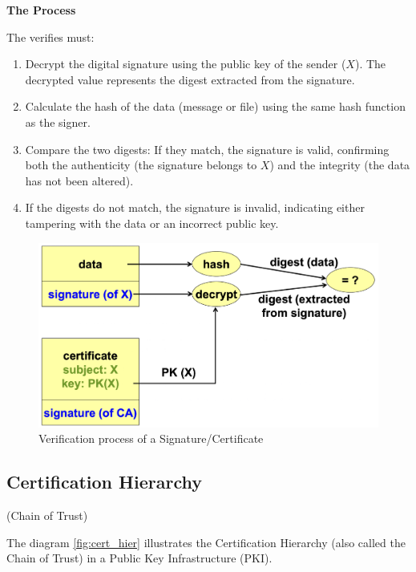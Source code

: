\begin{center}
    \textbf{The Process}
\end{center}
The verifies must:
\begin{enumerate}
    \item Decrypt the digital signature using the public key of the sender ($X$). The decrypted value represents the digest extracted from the signature.
    \item Calculate the hash of the data (message or file) using the same hash function as the signer.
    \item Compare the two digests: If they match, the signature is valid, confirming both the authenticity (the signature belongs to $X$) and the integrity (the data has not been altered).
    \item If the digests do not match, the signature is invalid, indicating either tampering with the data or an incorrect public key.
    \end{enumerate}
\begin{figure}[H]
    \centering
    \includegraphics[width=0.5\linewidth]{Images/Cryptography/cert_verif.png}
    \caption{Verification process of a Signature/Certificate}
\end{figure}

\subsection{Certification Hierarchy}
\begin{center}
    (Chain of Trust)
\end{center}
The diagram \ref{fig:cert_hier} illustrates the Certification Hierarchy (also called the Chain of Trust) in a Public Key Infrastructure (PKI).

\hfill

